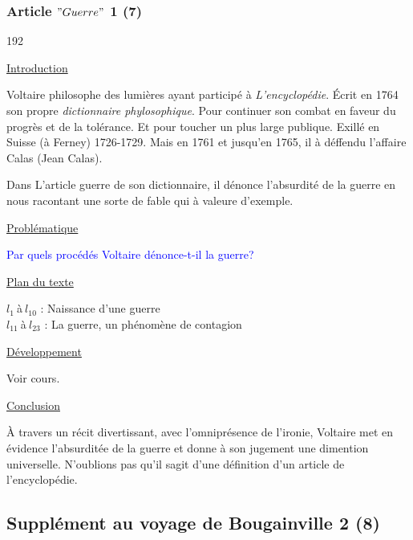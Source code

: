 \documentclass[12pt,a4paper]{article}
\begin{document}
				\subsubsection{Article $"Guerre"$ 1 (7)}

\begin{dingautolist}{192}

\item \underline{Introduction} \par
	Voltaire philosophe des lumi\`eres ayant particip\'e \`a \textit{L'encyclop\'edie}. \'Ecrit en 1764 son propre \textit{dictionnaire phylosophique}. 
	Pour continuer son combat en faveur du progr\`es et de la tol\'erance. Et pour toucher un plus large publique. Exill\'e en Suisse (\`a Ferney) 1726-1729. Mais en 1761 et jusqu'en 1765, il \`a d\'effendu l'affaire Calas (Jean Calas).\par
	Dans L'article guerre de son dictionnaire, il d\'enonce l'absurdit\'e de la guerre en nous racontant une sorte de fable qui \`a valeure d'exemple.
	
\item \underline{Probl\'ematique }\par
	\textcolor{blue}{Par quels proc\'ed\'es Voltaire d\'enonce-t-il la guerre?}

\item \underline{Plan du texte} \par
	$l_{1}~$\`a$~l_{10}$ : Naissance d'une guerre \\
	$l_{11}~$\`a$~l_{23}$ : La guerre, un ph\'enom\`ene de contagion

\item \underline{D\'eveloppement} \par
        Voir cours.

\item \underline{Conclusion} \par
	\`A travers un r\'ecit divertissant, avec l'omnipr\'esence de l'ironie, Voltaire met en \'evidence l'absurdit\'ee de la guerre et donne \`a son jugement une dimention universelle. N'oublions pas qu'il sagit d'une d\'efinition d'un article de l'encyclop\'edie. 

\end{dingautolist}
 \newpage

				\subsection{Suppl\'ement au voyage de Bougainville 2 (8)}
\end{document}

